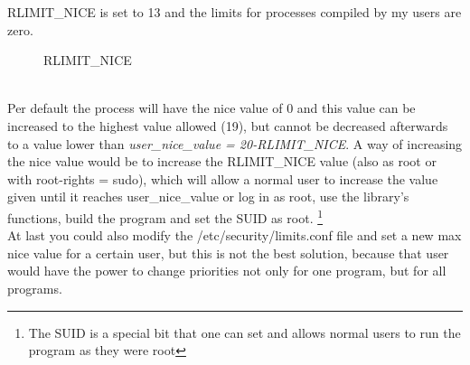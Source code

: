 RLIMIT\_NICE is set to 13 and the limits for processes compiled by my users are zero.
\begin{figure}[!htb]
	\centering
	\caption{RLIMIT\_NICE} 
	\label{RLIMIT_NICE}
\end{figure}
\\
Per default the process will have
the nice value of 0 and this value can be increased to the highest value allowed (19), but cannot be
decreased afterwards to a value lower than \textit{user\_nice\_value = 20-RLIMIT\_NICE}. A way of
increasing the nice value would be to increase the RLIMIT\_NICE value (also as root or with root-rights = sudo), which will allow a normal user to increase the value given until it reaches
\dq user\_nice\_value\dq{} or log in as root, use the library's functions, build the program and set the SUID as root.
\footnote{The SUID is a special bit that one can set and allows normal users to run the program as they
were root}\\
At last you could also modify the \dq/etc/security/limits.conf\dq{} file and set a new max nice value for a
certain user, but this is not the best solution, because that user would have the power to change
priorities not only for one program, but for all programs.
